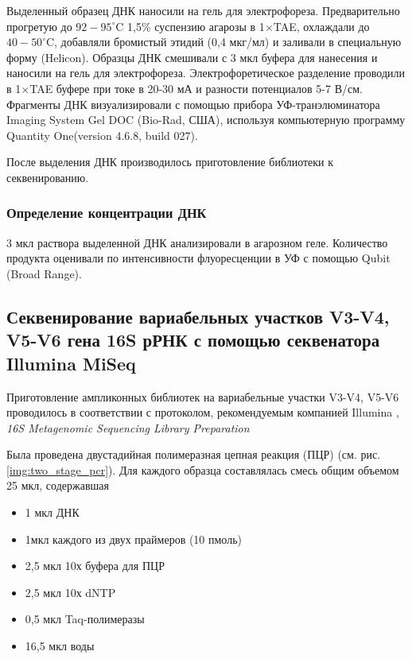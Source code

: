 Выделенный образец ДНК наносили на гель для электрофореза. Предварительно прогретую до $92-95^{\circ}$C 1,5\% суспензию агарозы в 1$\times$TAE, охлаждали до  $40-50^{\circ}$C, добавляли бромистый этидий (0,4 мкг/мл) и заливали в специальную форму (Helicon). Образцы ДНК  смешивали с 3 мкл буфера для нанесения и наносили на гель для электрофореза. Электрофоретическое разделение проводили в 1$\times$TAE буфере при токе в 20-30 мА и разности потенциалов 5-7 В/см. Фрагменты ДНК визуализировали с помощью прибора УФ-транэлюминатора Imaging System Gel DOC (Bio-Rad, США), используя компьютерную программу Quantity One(version 4.6.8, build 027). 

После выделения ДНК производилось приготовление библиотеки к секвенированию.

\subsubsection{Определение концентрации ДНК}

3 мкл раствора выделенной ДНК анализировали в агарозном геле. Количество продукта оценивали по интенсивности флуоресценции в УФ с помощью Qubit (Broad Range). 

\subsection{Секвенирование вариабельных участков V3-V4, V5-V6 гена 16S рРНК с помощью секвенатора Illumina MiSeq }  \label{subsect1_2_2}

Приготовление ампликонных библиотек на вариабельные участки V3-V4, V5-V6 проводилось  в соответствии с протоколом, рекомендуемым компанией Illumina , \textit{16S Metagenomic Sequencing Library Preparation }

Была проведена  двустадийная полимеразная цепная реакция (ПЦР) (см. рис. \ref{img:two_stage_pcr}). Для каждого образца составлялась смесь общим объемом 25 мкл, содержавшая

\begin{itemize}
\item 1 мкл ДНК
\item 1мкл каждого из двух праймеров (10 пмоль)
\item 2,5 мкл 10х буфера для ПЦР
\item 2,5 мкл 10х dNTP
\item 0,5 мкл  Taq-полимеразы
\item 16,5 мкл воды
\end{itemize}

